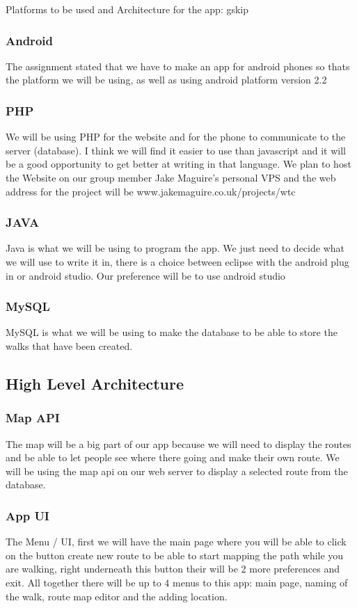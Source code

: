 \documentclass{project}
\begin{document}
Platforms to be used and Architecture for the app:
gskip

\subsubsection{Android}
The assignment stated that we have to make an app for android 
phones so thats the platform we will be using, as well as using android platform version 2.2

\subsubsection{PHP}
We will be using PHP for the website and for the phone to communicate 
to the server (database). I think we will find it easier to use than 
javascript and it will be a good opportunity to get better at writing 
in that language. We plan to host the Website on our group member Jake Maguire's personal VPS and the web address for the project will be www.jakemaguire.co.uk/projects/wtc

\subsubsection{JAVA}
Java is what we will be using to program the app. We just need to
decide what we will use to write it in, there is a choice between
eclipse with the android plug in or android studio. Our preference will be to use android studio

\subsubsection{MySQL}
MySQL is what we will be using to make the database to be able 
to store the walks that have been created. 

\subsection{High Level Architecture}
\subsubsection{Map API}
The map will be a big part of our app because we will need to display the
routes and be able to let people see where there going and make their own
route. We will be using the map api on our web server to display a selected route from the database.

\subsubsection{App UI}
The Menu / UI, first we will have the main page where you will 
be able to click on the button create new route to be able to start mapping 
the path while you are walking, right underneath this button their will be 
2 more preferences and exit. All together there will be up to 4 menus to 
this app: main page, naming of the walk, route map editor and the adding location. 
\end{document}

